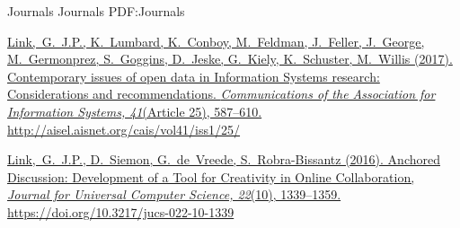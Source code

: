 \SubSection
{Journals}
{Journals}
{PDF:Journals}

\begingroup
\renewcommand{\MaxNumberedItem}{[8]}

\Gap
\NumberedItem{[2]}
\href{http://aisel.aisnet.org/cais/vol41/iss1/25/}
{\underline{Link,~G.~J.P.}, K.~Lumbard, K.~Conboy, M.~Feldman, J.~Feller, J.~George, M.~Germonprez, S.~Goggins, D.~Jeske, G.~Kiely, K.~Schuster, M.~Willis
(2017).
Contemporary issues of open data in Information Systems research: Considerations and recommendations.
\textit{Communications of the Association for Information Systems, 41}(Article 25), 
587–610. 
\url{http://aisel.aisnet.org/cais/vol41/iss1/25/}
}

\Gap
\NumberedItem{[1]}
\href{https://doi.org/10.3217/jucs-022-10-1339}
{\underline{Link,~G.~J.P.}, 
D.~Siemon, G.~de~Vreede, S.~Robra-Bissantz 
(2016). 
Anchored Discussion: Development of a Tool for Creativity in Online Collaboration, 
\textit{Journal for Universal Computer Science, 22}(10),
1339--1359. 
\url{https://doi.org/10.3217/jucs-022-10-1339}
}

\endgroup


